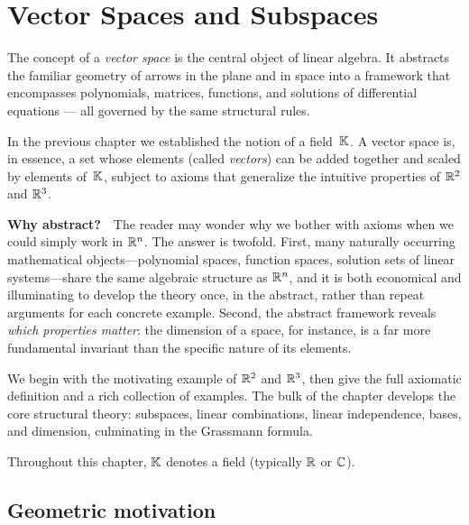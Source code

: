 
\chapter{Vector Spaces and Subspaces}\label{ch:vector-spaces}

The concept of a \emph{vector space} is the central
object of linear algebra. It abstracts the familiar geometry of arrows in
the plane and in space into a framework that encompasses polynomials,
matrices, functions, and solutions of differential equations --- all
governed by the same structural rules.

In the previous chapter we established the notion of a field~${\mathbb{K}}$. A
vector space is, in essence, a set whose elements (called \emph{vectors})
can be added together and scaled by elements of~${\mathbb{K}}$, subject to axioms
that generalize the intuitive properties of ${\mathbb{R}}^2$ and ${\mathbb{R}}^3$.

\medskip
\noindent\textbf{Why abstract?}\ \ The reader may wonder why we bother
with axioms when we could simply work in ${\mathbb{R}}^n$. The answer is twofold.
First, many naturally occurring mathematical objects---polynomial spaces,
function spaces, solution sets of linear systems---share the same
algebraic structure as ${\mathbb{R}}^n$, and it is both economical and illuminating
to develop the theory once, in the abstract, rather than repeat arguments
for each concrete example. Second, the abstract framework reveals
\emph{which properties matter}: the dimension of a space, for instance,
is a far more fundamental invariant than the specific nature of its
elements.

We begin with the motivating example of ${\mathbb{R}}^2$ and ${\mathbb{R}}^3$, then give the
full axiomatic definition and a rich collection of examples. The bulk of
the chapter develops the core structural theory: subspaces, linear
combinations, linear independence, bases, and dimension, culminating in
the Grassmann formula.

Throughout this chapter, ${\mathbb{K}}$ denotes a field (typically ${\mathbb{R}}$ or ${\mathbb{C}}$).


\section{Geometric motivation}\label{sec:geometric-motivation}


